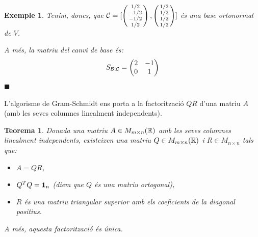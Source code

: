 \documentclass[
  11pt,
]{book}
\numberwithin{dummy}{section}
\theoremstyle{maincolornumbox}
\newtheorem{theorem}{TTTT}[chapter]
\newtheorem{theoremeT}{Teorema}[chapter]
\theoremstyle{blacknumex}
\newtheorem{exampleT}{Exemple}[chapter]
\theoremstyle{blacknumbox}
\theoremstyle{maincolornum}
\renewenvironment{theorem}{\begin{tBox}\begin{theoremeT}}{\end{theoremeT}\end{tBox}}
\newenvironment{example}{\begin{exampleT}}{\hfill{\tiny\ensuremath{\blacksquare}}\end{exampleT}}
\begin{document}
\begin{example}
Tenim, doncs, que
\(\mathcal{C}=[\left(\begin{smallmatrix}1/2\\-1/2\\-1/2\\1/2\end{smallmatrix}\right),\left(\begin{smallmatrix}1/2\\1/2\\1/2\\1/2\end{smallmatrix}\right)]\) és una
base ortonormal de \(V\).

A més, la matriu del canvi de base és:
\[S_{\mathcal{B},\mathcal{C}}=\begin{pmatrix} 2 & -1 \\ 0 & 1\end{pmatrix}\]
\end{example}

L'algorisme de Gram-Schmidt ens porta a la factorització \(QR\) d'una
matriu \(A\) (amb les seves columnes linealment independents).

\begin{theorem}
Donada una matriu \(A\in M_{m\times n}(\mathbb{R})\) amb les seves columnes
linealment independents, existeixen una matriu \(Q\in M_{m\times n}(\mathbb{R})\)
i \(R\in M_{n\times n}\) tals que:

\begin{itemize}
\item
  \(A=QR\),
\item
  \(Q^T Q=\mathbf{1}_n\) (diem que \(Q\) és una matriu ortogonal),
\item
  \(R\) és una matriu triangular superior amb els coeficients de la
  diagonal positius.
\end{itemize}

A més, aquesta factorització és única.
\end{theorem}
\end{document}
